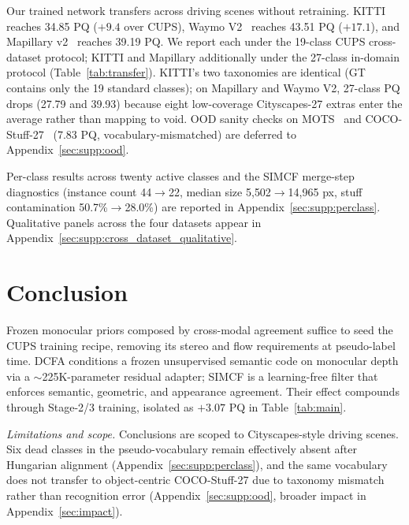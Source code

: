 \documentclass{article}
\renewcommand{\paragraph}[1]{\par\smallskip\noindent\textit{#1}\hspace{0.5em}\ignorespaces}
\begin{document}
Our trained network transfers across driving scenes without retraining. KITTI~\cite{geiger2012kitti} reaches 34.85 PQ ($+9.4$ over CUPS), Waymo V2~\cite{sun2020waymo} reaches 43.51 PQ ($+17.1$), and Mapillary v2~\cite{neuhold2017mapillary} reaches 39.19 PQ. We report each under the 19-class CUPS cross-dataset protocol; KITTI and Mapillary additionally under the 27-class in-domain protocol (Table~\ref{tab:transfer}). KITTI's two taxonomies are identical (GT contains only the 19 standard classes); on Mapillary and Waymo V2, 27-class PQ drops (27.79 and 39.93) because eight low-coverage Cityscapes-27 extras enter the average rather than mapping to void. OOD sanity checks on MOTS~\cite{voigtlaender2019mots} and COCO-Stuff-27~\cite{caesar2018coco} (7.83 PQ, vocabulary-mismatched) are deferred to Appendix~\ref{sec:supp:ood}.

Per-class results across twenty active classes and the SIMCF merge-step diagnostics (instance count 44$\to$22, median size 5{,}502$\to$14{,}965 px, stuff contamination 50.7\%$\to$28.0\%) are reported in Appendix~\ref{sec:supp:perclass}. Qualitative panels across the four datasets appear in Appendix~\ref{sec:supp:cross_dataset_qualitative}.


\FloatBarrier
\section{Conclusion}
\label{sec:conclusion}

Frozen monocular priors composed by cross-modal agreement suffice to seed the CUPS training recipe, removing its stereo and flow requirements at pseudo-label time. DCFA conditions a frozen unsupervised semantic code on monocular depth via a $\sim$225K-parameter residual adapter; SIMCF is a learning-free filter that enforces semantic, geometric, and appearance agreement. Their effect compounds through Stage-2/3 training, isolated as $+3.07$ PQ in Table~\ref{tab:main}.

\paragraph{Limitations and scope.}
Conclusions are scoped to Cityscapes-style driving scenes. Six dead classes in the pseudo-vocabulary remain effectively absent after Hungarian alignment (Appendix~\ref{sec:supp:perclass}), and the same vocabulary does not transfer to object-centric COCO-Stuff-27 due to taxonomy mismatch rather than recognition error (Appendix~\ref{sec:supp:ood}, broader impact in Appendix~\ref{sec:impact}).
\end{document}
